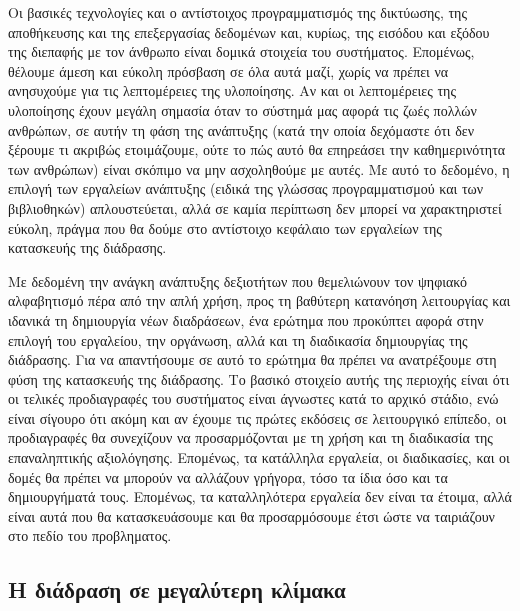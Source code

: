 \documentclass[
]{article}
\begin{document}
Οι βασικές τεχνολογίες και ο αντίστοιχος προγραμματισμός της δικτύωσης,
της αποθήκευσης και της επεξεργασίας δεδομένων και, κυρίως, της εισόδου
και εξόδου της διεπαφής με τον άνθρωπο είναι δομικά στοιχεία του
συστήματος. Επομένως, θέλουμε άμεση και εύκολη πρόσβαση σε όλα αυτά
μαζί, χωρίς να πρέπει να ανησυχούμε για τις λεπτομέρειες της υλοποίησης.
Αν και οι λεπτομέρειες της υλοποίησης έχουν μεγάλη σημασία όταν το
σύστημά μας αφορά τις ζωές πολλών ανθρώπων, σε αυτήν τη φάση της
ανάπτυξης (κατά την οποία δεχόμαστε ότι δεν ξέρουμε τι ακριβώς
ετοιμάζουμε, ούτε το πώς αυτό θα επηρεάσει την καθημερινότητα των
ανθρώπων) είναι σκόπιμο να μην ασχοληθούμε με αυτές. Με αυτό το
δεδομένο, η επιλογή των εργαλείων ανάπτυξης (ειδικά της γλώσσας
προγραμματισμού και των βιβλιοθηκών) απλουστεύεται, αλλά σε καμία
περίπτωση δεν μπορεί να χαρακτηριστεί εύκολη, πράγμα που θα δούμε στο
αντίστοιχο κεφάλαιο των εργαλείων της κατασκευής της διάδρασης.

Με δεδομένη την ανάγκη ανάπτυξης δεξιοτήτων που θεμελιώνουν τον ψηφιακό
αλφαβητισμό πέρα από την απλή χρήση, προς τη βαθύτερη κατανόηση
λειτουργίας και ιδανικά τη δημιουργία νέων διαδράσεων, ένα ερώτημα που
προκύπτει αφορά στην επιλογή του εργαλείου, την οργάνωση, αλλά και τη
διαδικασία δημιουργίας της διάδρασης. Για να απαντήσουμε σε αυτό το
ερώτημα θα πρέπει να ανατρέξουμε στη φύση της κατασκευής της διάδρασης.
Το βασικό στοιχείο αυτής της περιοχής είναι ότι οι τελικές προδιαγραφές
του συστήματος είναι άγνωστες κατά το αρχικό στάδιο, ενώ είναι σίγουρο
ότι ακόμη και αν έχουμε τις πρώτες εκδόσεις σε λειτουργικό επίπεδο, οι
προδιαγραφές θα συνεχίζουν να προσαρμόζονται με τη χρήση και τη
διαδικασία της επαναληπτικής αξιολόγησης. Επομένως, τα κατάλληλα
εργαλεία, οι διαδικασίες, και οι δομές θα πρέπει να μπορούν να αλλάζουν
γρήγορα, τόσο τα ίδια όσο και τα δημιουργήματά τους. Επομένως, τα
καταλληλότερα εργαλεία δεν είναι τα έτοιμα, αλλά είναι αυτά που θα
κατασκευάσουμε και θα προσαρμόσουμε έτσι ώστε να ταιριάζουν στο πεδίο
του προβληματος.

\hypertarget{ux3b7-ux3b4ux3b9ux3acux3b4ux3c1ux3b1ux3c3ux3b7-ux3c3ux3b5-ux3bcux3b5ux3b3ux3b1ux3bbux3cdux3c4ux3b5ux3c1ux3b7-ux3baux3bbux3afux3bcux3b1ux3baux3b1}{%
\subsection{Η διάδραση σε μεγαλύτερη
κλίμακα}\label{ux3b7-ux3b4ux3b9ux3acux3b4ux3c1ux3b1ux3c3ux3b7-ux3c3ux3b5-ux3bcux3b5ux3b3ux3b1ux3bbux3cdux3c4ux3b5ux3c1ux3b7-ux3baux3bbux3afux3bcux3b1ux3baux3b1}}
\end{document}
